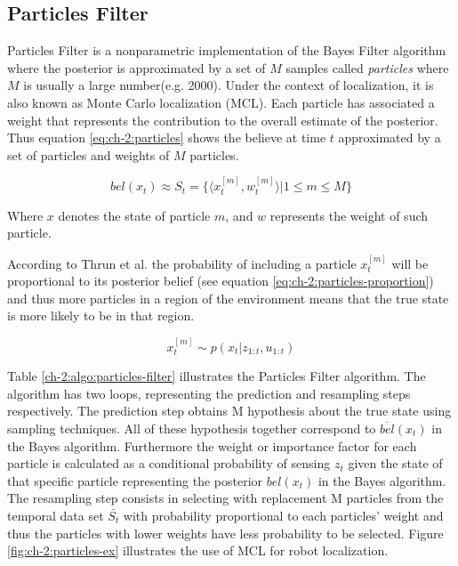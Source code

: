 \subsection{Particles Filter}

Particles Filter is a nonparametric implementation of the Bayes Filter algorithm where the posterior is approximated by a set of $M$ samples called \textit{particles} where $M$ is usually a large number(e.g. 2000). Under the context of localization, it is also known as Monte Carlo localization (MCL)\cite{Thrun00j}. Each particle has associated a weight that represents the contribution to the overall estimate of the posterior\cite{Rekleitis:particles-filter}. Thus equation \ref{eq:ch-2:particles}  shows the believe at time $t$ approximated by a set of particles and weights of $M$ particles.

\begin{equation}\label{eq:ch-2:particles}
bel(x_t) \approx S_t = \lbrace \langle x_t^{[m]},w_t^{[m]} \rangle |  1 \leq m \leq M \rbrace
\end{equation}

Where $x$ denotes the state of particle $m$, and $w$ represents the weight of such particle. 

According to Thrun et al. the probability of including a particle $x_t^{[m]}$ will be proportional to its posterior belief (see equation \ref{eq:ch-2:particles-proportion}) and thus more particles in a region of the environment means that the true state is more likely to be in that region.

\begin{equation}\label{eq:ch-2:particles-proportion}
x_t^{[m]} \sim p(x_t | z_{1:t}, u_{1:t})
\end{equation}

Table \ref{ch-2:algo:particles-filter} illustrates the Particles Filter algorithm. The algorithm has two loops, representing the prediction and resampling steps respectively. The prediction step obtains M hypothesis about the true state using sampling techniques. All of these hypothesis together correspond to $\overline{bel}(x_t)$ in the Bayes algorithm. Furthermore the weight or importance factor for each particle is calculated as a conditional probability of sensing $z_t$ given the state of that specific particle representing the posterior $bel(x_t)$ in the Bayes algorithm. The resampling step consists in selecting with replacement M particles from the temporal data set $\bar{S_t}$ with probability proportional to each particles' weight and thus the particles with lower weights have less probability to be selected\cite{Thrun:2005:PR:1121596}. Figure \ref{fig:ch-2:particles-ex} illustrates the use of MCL for robot localization.

